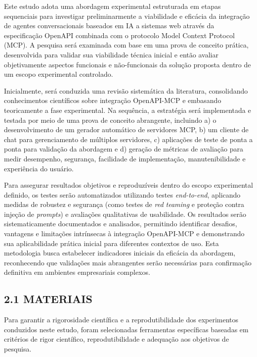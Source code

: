 \documentclass[
]{article}
\begin{document}
Este estudo adota uma abordagem experimental estruturada em etapas
sequenciais para investigar preliminarmente a viabilidade e eficácia da
integração de agentes conversacionais baseados em IA a sistemas web
através da especificação OpenAPI combinada com o protocolo Model Context
Protocol (MCP). A pesquisa será examinada com base em uma prova de
conceito prática, desenvolvida para validar sua viabilidade técnica
inicial e então avaliar objetivamente aspectos funcionais e
não-funcionais da solução proposta dentro de um escopo experimental
controlado.

Inicialmente, será conduzida uma revisão sistemática da literatura,
consolidando conhecimentos científicos sobre integração OpenAPI-MCP e
embasando teoricamente a fase experimental. Na sequência, a estratégia
será implementada e testada por meio de uma prova de conceito
abrangente, incluindo a) o desenvolvimento de um gerador automático de
servidores MCP, b) um cliente de chat para gerenciamento de múltiplos
servidores, c) aplicações de teste de ponta a ponta para validação da
abordagem e d) geração de métricas de avaliação para medir desempenho,
segurança, facilidade de implementação, manutenibilidade e experiência
do usuário.

Para assegurar resultados objetivos e reproduzíveis dentro do escopo
experimental definido, os testes serão automatizados utilizando testes
\emph{end-to-end}, aplicando medidas de robustez e segurança (como
testes de \emph{red teaming} e proteção contra injeção de
\emph{prompts}) e avaliações qualitativas de usabilidade. Os resultados
serão sistematicamente documentados e analisados, permitindo identificar
desafios, vantagens e limitações intrínsecas à integração OpenAPI-MCP e
demonstrando sua aplicabilidade prática inicial para diferentes
contextos de uso. Esta metodologia busca estabelecer indicadores
iniciais da eficácia da abordagem, reconhecendo que validações mais
abrangentes serão necessárias para confirmação definitiva em ambientes
empresariais complexos.

\subsection{2.1 MATERIAIS}\label{materiais}

Para garantir a rigorosidade científica e a reprodutibilidade dos
experimentos conduzidos neste estudo, foram selecionadas ferramentas
específicas baseadas em critérios de rigor científico, reprodutibilidade
e adequação aos objetivos de pesquisa.
\end{document}
